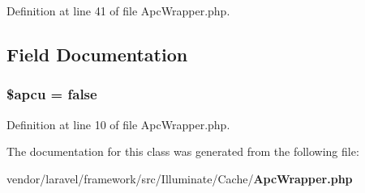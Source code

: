Definition at line 41 of file Apc\+Wrapper.\+php.



\subsection{Field Documentation}
\subsubsection[{\$apcu}]{\setlength{\rightskip}{0pt plus 5cm}\$apcu = false\hspace{0.3cm}{\ttfamily [protected]}}\label{class_illuminate_1_1_cache_1_1_apc_wrapper_a24c27618e6856c74703e5a07eebfdd86}


Definition at line 10 of file Apc\+Wrapper.\+php.



The documentation for this class was generated from the following file\+:\begin{DoxyCompactItemize}
\item 
vendor/laravel/framework/src/\+Illuminate/\+Cache/{\bf Apc\+Wrapper.\+php}\end{DoxyCompactItemize}
